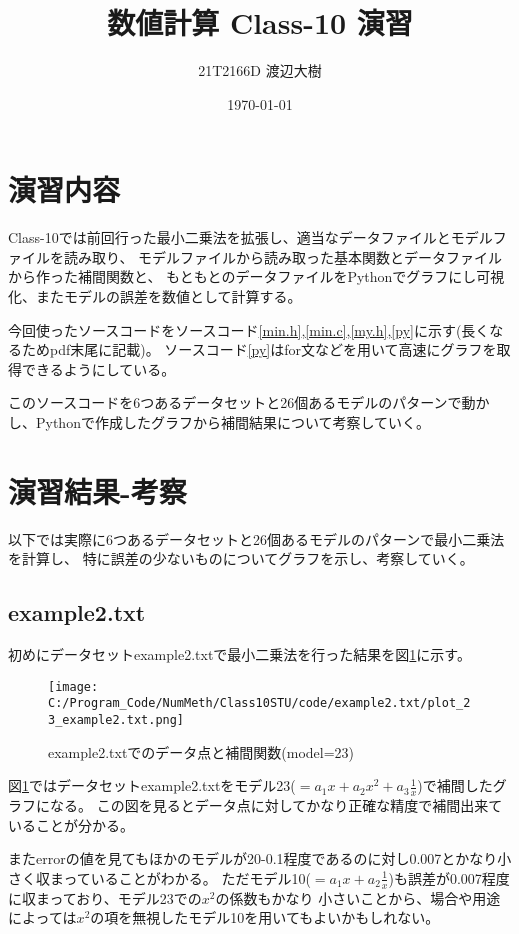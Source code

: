 \documentclass[a4paper,11pt,dvipdfmx]{jsarticle}
\begin{document}

\title{数値計算 Class-10 演習}
\author{21T2166D 渡辺大樹}
\date{\today}
\maketitle

\section{演習内容}
Class-10では前回行った最小二乗法を拡張し、適当なデータファイルとモデルファイルを読み取り、
モデルファイルから読み取った基本関数とデータファイルから作った補間関数と、
もともとのデータファイルをPythonでグラフにし可視化、またモデルの誤差を数値として計算する。

今回使ったソースコードをソースコード\ref{min.h},\ref{min.c},\ref{my.h},\ref{py}に示す(長くなるためpdf末尾に記載)。
ソースコード\ref{py}はfor文などを用いて高速にグラフを取得できるようにしている。

このソースコードを6つあるデータセットと26個あるモデルのパターンで動かし、Pythonで作成したグラフから補間結果について考察していく。


\section{演習結果-考察}
以下では実際に6つあるデータセットと26個あるモデルのパターンで最小二乗法を計算し、
特に誤差の少ないものについてグラフを示し、考察していく。

\subsection{example2.txt}
初めにデータセットexample2.txtで最小二乗法を行った結果を図\ref{ex2}に示す。
\begin{figure}[h]
\centering
\texttt{[image: C:/Program\_Code/NumMeth/Class10STU/code/example2.txt/plot\_23\_example2.txt.png]}
\caption{example2.txtでのデータ点と補間関数(model=23)}
\label{ex2}
\end{figure}

図\ref{ex2}ではデータセットexample2.txtをモデル23($=a_1x+a_2x^2+a_3\frac{1}{x}$)で補間したグラフになる。
この図を見るとデータ点に対してかなり正確な精度で補間出来ていることが分かる。

またerrorの値を見てもほかのモデルが20-0.1程度であるのに対し0.007とかなり小さく収まっていることがわかる。
ただモデル10($=a_1x+a_2\frac{1}{x}$)も誤差が0.007程度に収まっており、モデル23での$x^2$の係数もかなり
小さいことから、場合や用途によっては$x^2$の項を無視したモデル10を用いてもよいかもしれない。
\end{document}
